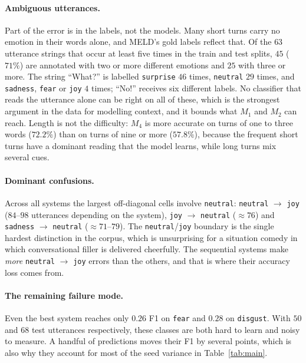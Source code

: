 \documentclass[sigconf,nonacm]{acmart}
\begin{document}
\paragraph{Ambiguous utterances.}
Part of the error is in the labels, not the models. Many short turns carry no emotion in
their words alone, and MELD's gold labels reflect that. Of the $63$ utterance strings that
occur at least five times in the train and test splits, $45$ ($71\%$) are annotated with
two or more different emotions and $25$ with three or more. The string ``What?'' is labelled
\texttt{surprise} $46$ times, \texttt{neutral} $29$ times, and \texttt{sadness},
\texttt{fear} or \texttt{joy} $4$ times; ``No!'' receives six different labels. No
classifier that reads the utterance alone can be right on all of these, which is the
strongest argument in the data for modelling context, and it bounds what $M_1$ and $M_2$
can reach. Length is not the difficulty: $M_4$ is more accurate on turns of one to three
words ($72.2\%$) than on turns of nine or more ($57.8\%$), because the frequent short
turns have a dominant reading that the model learns, while long turns mix several cues.

\paragraph{Dominant confusions.}
Across all systems the largest off-diagonal cells involve \texttt{neutral}:
\texttt{neutral} $\rightarrow$ \texttt{joy} ($84$--$98$ utterances depending on the system),
\texttt{joy} $\rightarrow$ \texttt{neutral} ($\approx 76$) and
\texttt{sadness} $\rightarrow$ \texttt{neutral} ($\approx 71$--$79$). The
\texttt{neutral}/\texttt{joy} boundary is the single hardest distinction in the corpus,
which is unsurprising for a situation comedy in which conversational filler is delivered
cheerfully. The sequential systems make \emph{more} \texttt{neutral} $\rightarrow$
\texttt{joy} errors than the others, and that is where their accuracy loss comes from.

\paragraph{The remaining failure mode.}
Even the best system reaches only $0.26$ F1 on \texttt{fear} and $0.28$ on
\texttt{disgust}. With $50$ and $68$ test utterances respectively, these classes are both
hard to learn and noisy to measure. A handful of predictions moves their F1 by several
points, which is also why they account for most of the seed variance in Table~\ref{tab:main}.
\end{document}
